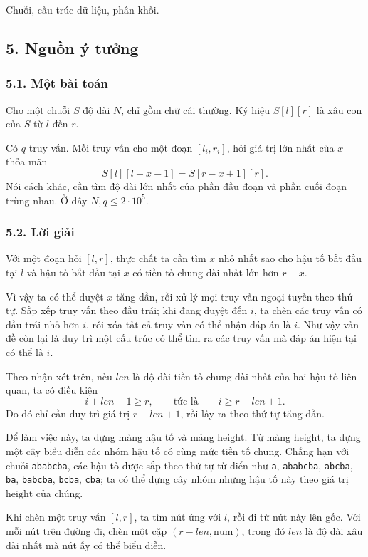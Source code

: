 \documentclass[11pt]{article}
\begin{document}
Chuỗi, cấu trúc dữ liệu, phân khối.

\subsection*{5. Nguồn ý tưởng}

\subsubsection*{5.1. Một bài toán}

Cho một chuỗi \(S\) độ dài \(N\), chỉ gồm chữ cái thường. Ký hiệu
\(S[l][r]\) là xâu con của \(S\) từ \(l\) đến \(r\).

Có \(q\) truy vấn. Mỗi truy vấn cho một đoạn \([l_i,r_i]\), hỏi giá trị lớn
nhất của \(x\) thỏa mãn
\[
  S[l][l+x-1]=S[r-x+1][r].
\]
Nói cách khác, cần tìm độ dài lớn nhất của phần đầu đoạn và phần cuối đoạn
trùng nhau. Ở đây \(N,q\le 2\cdot10^5\).

\subsubsection*{5.2. Lời giải}

Với một đoạn hỏi \([l,r]\), thực chất ta cần tìm \(x\) nhỏ nhất sao cho hậu tố
bắt đầu tại \(l\) và hậu tố bắt đầu tại \(x\) có tiền tố chung dài nhất lớn
hơn \(r-x\).

Vì vậy ta có thể duyệt \(x\) tăng dần, rồi xử lý mọi truy vấn ngoại tuyến theo
thứ tự. Sắp xếp truy vấn theo đầu trái; khi đang duyệt đến \(i\), ta chèn các
truy vấn có đầu trái nhỏ hơn \(i\), rồi xóa tất cả truy vấn có thể nhận đáp án
là \(i\). Như vậy vấn đề còn lại là duy trì một cấu trúc có thể tìm ra các
truy vấn mà đáp án hiện tại có thể là \(i\).

Theo nhận xét trên, nếu \(len\) là độ dài tiền tố chung dài nhất của hai hậu
tố liên quan, ta có điều kiện
\[
  i+len-1\ge r,\qquad\text{tức là}\qquad i\ge r-len+1.
\]
Do đó chỉ cần duy trì giá trị \(r-len+1\), rồi lấy ra theo thứ tự tăng dần.

Để làm việc này, ta dựng mảng hậu tố và mảng \(\mathrm{height}\). Từ mảng
\(\mathrm{height}\), ta dựng một cây biểu diễn các nhóm hậu tố có cùng mức
tiền tố chung. Chẳng hạn với chuỗi \texttt{ababcba}, các hậu tố được sắp theo
thứ tự từ điển như \texttt{a}, \texttt{ababcba}, \texttt{abcba},
\texttt{ba}, \texttt{babcba}, \texttt{bcba}, \texttt{cba}; ta có thể dựng cây
nhóm những hậu tố này theo giá trị \(\mathrm{height}\) của chúng.

Khi chèn một truy vấn \([l,r]\), ta tìm nút ứng với \(l\), rồi đi từ nút này
lên gốc. Với mỗi nút trên đường đi, chèn một cặp
\((r-len,\mathrm{num})\), trong đó \(len\) là độ dài xâu dài nhất mà nút ấy có
thể biểu diễn.
\end{document}
